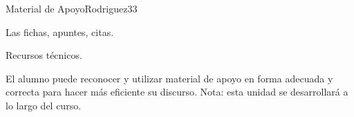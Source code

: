 \begin{syllabus}
\begin{unit}{Material de Apoyo}{Rodriguez}{3}{3}
\begin{topics}
	\item Las fichas, apuntes, citas.
	\item Recursos técnicos.
\end{topics}
\begin{learningoutcomes}
	\item El alumno puede reconocer y utilizar material de apoyo en forma adecuada y correcta para hacer más eficiente su discurso. Nota: esta unidad se desarrollará a lo largo del curso.
\end{learningoutcomes}
\end{unit}



\begin{coursebibliography}
\end{coursebibliography}
\end{syllabus}
